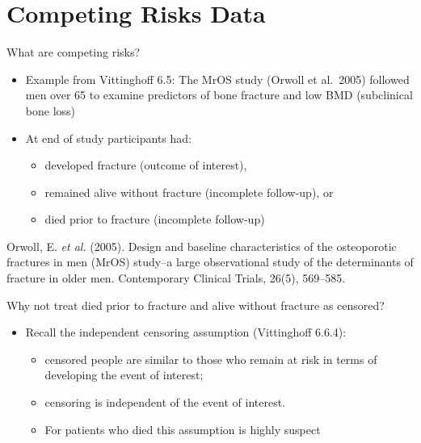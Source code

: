 \documentclass[
  ignorenonframetext,
]{beamer}
\providecommand{\tightlist}{%
  \setlength{\itemsep}{0pt}\setlength{\parskip}{0pt}}
\begin{document}
\hypertarget{competing-risks-data}{%
\section{Competing Risks Data}\label{competing-risks-data}}

\begin{frame}{What are competing risks?}
\protect\hypertarget{what-are-competing-risks}{}

\begin{itemize}
\tightlist
\item
  Example from Vittinghoff 6.5: The MrOS study (Orwoll et al.~2005)
  followed men over 65 to examine predictors of bone fracture and low
  BMD (subclinical bone loss)
\item
  At end of study participants had:

  \begin{itemize}
  \tightlist
  \item
    developed fracture (outcome of interest),
  \item
    remained alive without fracture (incomplete follow-up), or
  \item
    died prior to fracture (incomplete follow-up)
  \end{itemize}
\end{itemize}

\tiny Orwoll, E. \emph{et al.} (2005). Design and baseline
characteristics of the osteoporotic fractures in men (MrOS) study--a
large observational study of the determinants of fracture in older men.
Contemporary Clinical Trials, 26(5), 569--585.

\end{frame}

\begin{frame}{Why not treat died prior to fracture and alive without
fracture as censored?}
\protect\hypertarget{why-not-treat-died-prior-to-fracture-and-alive-without-fracture-as-censored}{}

\begin{itemize}
\tightlist
\item
  Recall the independent censoring assumption (Vittinghoff 6.6.4):

  \begin{itemize}
  \tightlist
  \item
    censored people are similar to those who remain at risk in terms of
    developing the event of interest;
  \item
    censoring is independent of the event of interest.
  \item
    For patients who died this assumption is highly suspect
  \end{itemize}
\end{itemize}

\end{frame}
\end{document}
